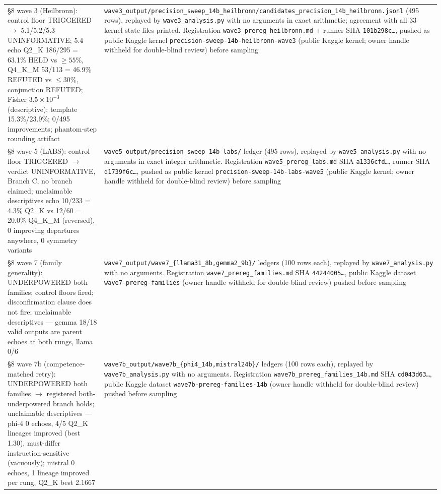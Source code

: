 \begin{longtable}{@{}p{}p{}@{}}
\S8 wave 3 (Heilbronn): control floor TRIGGERED $\rightarrow$ 5.1/5.2/5.3 UNINFORMATIVE; 5.4 echo Q2\_K 186/295 = 63.1\% HELD vs $\ge 55\%$, Q4\_K\_M 53/113 = 46.9\% REFUTED vs $\le 30\%$, conjunction REFUTED; Fisher $3.5\times10^{-3}$ (descriptive); template 15.3\%/23.9\%; 0/495 improvements; phantom-step rounding artifact &
\texttt{wave3\_\bk{}output/\bk{}precision\_\bk{}sweep\_\bk{}14b\_\bk{}heilbronn/\bk{}candidates\_\bk{}precision\_\bk{}14b\_\bk{}heilbronn.jsonl} (495 rows), replayed by \texttt{wave3\_analysis.py} with no arguments in exact arithmetic; agreement with all 33 kernel state files printed. Registration \texttt{wave3\_prereg\_heilbronn.md} + runner SHA \texttt{101b298c\ldots}, pushed as public Kaggle kernel \texttt{precision-sweep-14b-heilbronn-wave3} (public Kaggle kernel; owner handle withheld for double-blind review) before sampling \\

\S8 wave 5 (LABS): control floor TRIGGERED $\rightarrow$ verdict UNINFORMATIVE, Branch C, no branch claimed; unclaimable descriptives echo 10/233 = 4.3\% Q2\_K vs 12/60 = 20.0\% Q4\_K\_M (reversed), 0 improving departures anywhere, 0 symmetry variants &
\texttt{wave5\_\bk{}output/\bk{}precision\_\bk{}sweep\_\bk{}14b\_\bk{}labs/\bk{}} ledger (495 rows), replayed by \texttt{wave5\_analysis.py} with no arguments in exact integer arithmetic. Registration \texttt{wave5\_prereg\_labs.md} SHA \texttt{a1336cfd\ldots}, runner SHA \texttt{d1739f6c\ldots}, pushed as public kernel \texttt{precision-sweep-14b-labs-wave5} (public Kaggle kernel; owner handle withheld for double-blind review) before sampling \\

\S8 wave 7 (family generality): UNDERPOWERED both families; control floors fired; disconfirmation clause does not fire; unclaimable descriptives --- gemma 18/18 valid outputs are parent echoes at both rungs, llama 0/6 &
\texttt{wave7\_\bk{}output/\bk{}wave7\_\bk{}\{llama31\_\bk{}8b,gemma2\_\bk{}9b\}/\bk{}} ledgers (100 rows each), replayed by \texttt{wave7\_analysis.py} with no arguments. Registration \texttt{wave7\_prereg\_families.md} SHA \texttt{44244005\ldots}, public Kaggle dataset \texttt{wave7-prereg-families} (owner handle withheld for double-blind review) pushed before sampling \\

\S8 wave 7b (competence-matched retry): UNDERPOWERED both families $\rightarrow$ registered both-underpowered branch holds; unclaimable descriptives --- phi-4 0 echoes, 4/5 Q2\_K lineages improved (best 1.30), must-differ instruction-sensitive (vacuously); mistral 0 echoes, 1 lineage improved per rung, Q2\_K best 2.1667 &
\texttt{wave7b\_\bk{}output/\bk{}wave7b\_\bk{}\{phi4\_\bk{}14b,mistral24b\}/\bk{}} ledgers (100 rows each), replayed by \texttt{wave7b\_analysis.py} with no arguments. Registration \texttt{wave7b\_prereg\_families\_14b.md} SHA \texttt{cd043d63\ldots}, public Kaggle dataset \texttt{wave7b-prereg-families-14b} (owner handle withheld for double-blind review) pushed before sampling \\


\end{longtable}
